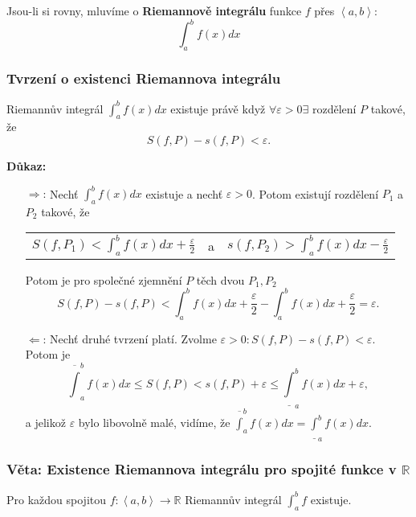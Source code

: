 \documentclass[../main.tex]{subfiles}
\begin{document}
Jsou-li si rovny, mluvíme o \textbf{Riemannově integrálu} funkce $f$ přes $\left<a,b\right>$:
\[\int^b_a f(x) dx\]

\noindent
\subsubsection{Tvrzení o existenci Riemannova integrálu}
\hspace{1.2mm}
Riemannův integrál $\int^b_a f(x) dx$ existuje právě když $\forall \varepsilon > 0 \exists$ rozdělení $P$ takové, že
\[S(f,P) - s(f,P) < \varepsilon.\]

\vspace{5mm}
\noindent
\textbf{Důkaz:} 
\begin{enumerate}
	\item[$\Rightarrow$:] Nechť $\int^b_a f(x) dx$ existuje a nechť $\varepsilon > 0$. Potom existují rozdělení $P_1$ a $P_2$ takové, že
    \begin{center}
        \begin{tabular}{ c c c }
            $S(f,P_1) < \int^b_a f(x) dx + \frac{\varepsilon}{2}$ & a & $s(f,P_2) > \int^b_a f(x) dx - \frac{\varepsilon}{2}$  \\
        \end{tabular}
    \end{center}
    Potom je pro společné zjemnění $P$ těch dvou $P_1,P_2$
    \[S(f,P) - s(f,P) < \int^b_a f(x)dx + \frac{\varepsilon}{2} - \int^b_a f(x)dx + \frac{\varepsilon}{2} = \varepsilon.\]
    \item[$\Leftarrow$:] Nechť druhé tvrzení platí. Zvolme $\varepsilon > 0 : S(f,P) - s(f,P) < \varepsilon.$ Potom je 
    \[\overline{\int}^b_a f(x)dx \leq S(f,P) < s(f,P) + \varepsilon \leq \underline{\int}^b_a f(x)dx + \varepsilon,\]
    a jelikož $\varepsilon$ bylo libovolně malé, vidíme, že $\overline{\int}^b_a f(x)dx = \underline{\int}^b_a f(x)dx.$
\end{enumerate}
\noindent


\subsubsection{Věta: Existence Riemannova integrálu pro spojité funkce v $\mathbb{R}$}
\hspace{1.2mm}
Pro každou spojitou $f : \left<a,b\right> \rightarrow \mathbb{R}$ Riemannův integrál $\int^b_a f$ existuje.
\vspace{5mm}
\end{document}
